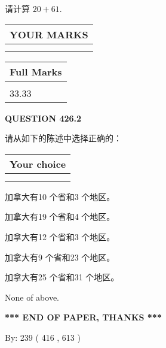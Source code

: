 \documentclass{ctexart}
\begin{document}
  
 
请计算 $ %
20 +  %
61 $.
 

 

 
  
\vspace{0.2in}
  
\noindent\begin{tabular}{|l|}
\hline
 YOUR MARKS  \\
\hline
 \\ 
 \\ 
\hline
\end{tabular}
\hspace{0.05in} \begin{tabular}{|l|}
\hline
 Full Marks  \\
\hline
 \\ 
33.33 \\
\hline
\end{tabular}
{\textbf{\Large{QUESTION
426.2 
}}}
  
  
请从如下的陈述中选择正确的：
  
  
\noindent\hspace{3.0in} \begin{tabular}{|l|}
\hline
Your choice \\
\hline
 \\ 
 \\ 
\hline
\end{tabular}
  
  
 
 
加拿大有10 个省和3 个地区。
 
 
加拿大有19 个省和4 个地区。
 
 
加拿大有12 个省和3 个地区。
 
 
加拿大有9 个省和23 个地区。
 
 
加拿大有25 个省和31 个地区。
 
 
 None of above.
 
 
   
   
 \vspace{0.2in}
 
   
   
   
   
\vspace{1.0in} 
{\textbf{\large{ *** END OF PAPER, THANKS *** }}} 
   
   
\hspace{1.0in} By: 
 239 ( 416 ,  613 )
   
\end{document}
